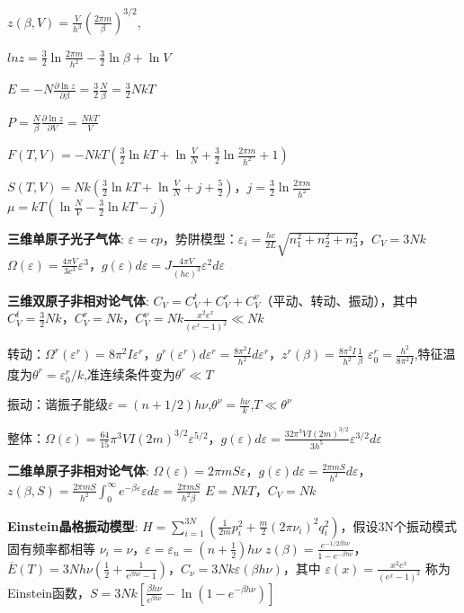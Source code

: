 \documentclass[a4paper,8pt]{extarticle} %
\begin{document}
\begin{multicols}{3}
$z(\beta,V)=\frac{V}{h^3}\left(\frac{2\pi m}{\beta}\right)^{3/2}$,

$lnz=\frac{3}{2}\ln \frac{2\pi m}{h^2} - \frac{3}{2}\ln\beta + \ln V$

$E=-N\frac{\partial \ln z}{\partial \beta} = \frac{3}{2}\frac{N}{\beta} = \frac{3}{2}NkT$

$P=\frac{N}{\beta}\frac{\partial \ln z}{\partial V} = \frac{NkT}{V}$

$F(T,V) = -NkT(\frac{3}{2}\ln kT + \ln \frac{V}{N} + \frac{3}{2}\ln \frac{2\pi m}{h^2} + 1)$

$S(T,V) = Nk(\frac{3}{2}\ln kT + \ln \frac{V}{N} + j + \frac{5}{2})$，$j = \frac{3}{2}\ln \frac{2\pi m}{h^2}$
$\mu = kT(\ln \frac{N}{V} - \frac{3}{2}\ln kT - j)$

\textbf{三维单原子光子气体}:
$\varepsilon = cp$，势阱模型：$\varepsilon_i = \frac{hc}{2L}\sqrt{n_1^2+n_2^2+n_3^2}$，$C_V = 3Nk$
$\Omega(\varepsilon) = \frac{4\pi V}{3c^3}\varepsilon^3$，$g(\varepsilon)d\varepsilon = J\frac{4\pi V}{(hc)^3}\varepsilon^2d\varepsilon$

\textbf{三维双原子非相对论气体}:
$C_V = C_V^t + C_V^r + C_V^v$（平动、转动、振动），其中 $C_V^t = \frac{3}{2}Nk$，$C_V^r = Nk$，$C_V^\nu = Nk\frac{x^2e^x}{(e^x-1)^2} \ll Nk$

转动：$\Omega^r(\varepsilon^r) = 8\pi^2I\varepsilon^r$，$g^r(\varepsilon^r)d\varepsilon^r = \frac{8\pi^2I}{h^2}d\varepsilon^r$，$z^r(\beta) = \frac{8\pi^2I}{h^2}\frac{1}{\beta}$
$\varepsilon_0^r = \frac{h^2}{8\pi^2I}$,特征温度为$\theta^r=\varepsilon_0^r/k$,准连续条件变为$\theta^r \ll T$

振动：谐振子能级$\varepsilon=(n+1/2)h\nu$,$\theta^\nu = \frac{h\nu}{k}$,$T \ll \theta^\nu$

整体：$\Omega(\varepsilon) = \frac{64}{15}\pi^3VI(2m)^{3/2}\varepsilon^{5/2}$，$g(\varepsilon)d\varepsilon = \frac{32\pi^3VI(2m)^{3/2}}{3h^5}\varepsilon^{3/2}d\varepsilon$

\textbf{二维单原子非相对论气体}:
$\Omega(\varepsilon) = 2\pi mS\varepsilon$，$g(\varepsilon)d\varepsilon = \frac{2\pi mS}{h^2}d\varepsilon$，
$z(\beta,S) = \frac{2\pi mS}{h^2}\int_0^{\infty}e^{-\beta\varepsilon}\varepsilon d\varepsilon = \frac{2\pi mS}{h^2\beta}$
$E = NkT$，$C_V = Nk$

\textbf{Einstein晶格振动模型}:
$H = \sum_{i=1}^{3N}(\frac{1}{2m}p_i^2 + \frac{m}{2}(2\pi\nu_i)^2q_i^2)$，假设3N个振动模式固有频率都相等 $\nu_i = \nu$，$\varepsilon = \varepsilon_n = (n+\frac{1}{2})h\nu$
$z(\beta) = \frac{e^{-1/2\beta h\nu}}{1-e^{-\beta h\nu}}$，$\overline{E}(T) = 3Nh\nu(\frac{1}{2} + \frac{1}{e^{\beta h\nu}-1})$，$C_\nu = 3Nk\varepsilon(\beta h\nu)$，其中
$\varepsilon(x) = \frac{x^2e^x}{(e^x-1)^2}$ 称为Einstein函数，$S = 3Nk[\frac{\beta h\nu}{e^{\beta h\nu}} - \ln(1-e^{-\beta h\nu})]$


\end{multicols}
\end{document}
